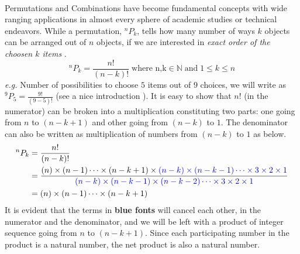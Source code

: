 \documentclass[10pt, twoside]{article}
\newcommand*{\Permutation}[2]{{}^{#1}P_{#2}}%
\begin{document}
	\paragraph{}Permutations and Combinations have become fundamental concepts with wide ranging applications in almost every sphere of academic studies or technical endeavors. While a permutation, $\Permutation{n}{k}$, tells how many number of ways $k$ objects can be arranged out of $n$ objects, if we are interested in \textit{exact order of the choosen $k$ items} \cite{PrincTechCombinatorics}.
		\begin{equation}
			\Permutation{n}{k} = \frac{n!}{(n-k)!}  \; \text{where n,k} \in \mathbb{N}  \; \text{and} \; 1 \leq k \leq n
		\end{equation}
		 \textit{e.g.} Number of possibilities to choose $5$ items out of $9$ choices, we will write as $\Permutation{9}{5} =\frac{9!}{(9-5)!}$ (see a nice introduction \cite{ProbabilityKIndle}).
		 It is easy to show that $n!$ (in the numerator) can be broken into a multiplication constituting two parts: one going from $n$ to $(n-k+1)$ and other going from $(n-k)$ to $1$. The denominator can also be written as multiplication of numbers from {\color{blue}$(n-k)$} to {\color{blue}$1$} as below.
		 \begin{align}
		 	\Permutation{n}{k} &= \frac{n!}{(n-k)!} \nonumber \\
		 	&= \frac{(n)\times(n-1)\cdots\times(n-k+1)\times\color{blue}(n-k)\times(n-k-1)\cdots\times3\times2\times1}{\color{blue}(n-k)\times(n-k-1)\times(n-k-2)\cdots\times3\times2\times1} \nonumber \\
		 	&= (n)\times(n-1)\cdots\times(n-k+1) \label{CondensedEquationPermutation}
		 \end{align}
	 	It is evident that the terms in \textbf{\color{blue}blue fonts} will cancel each other, in the numerator and the denominator, and we will be left with a product of integer sequence going from $n$ to $(n-k+1)$. Since each participating number in the product is a natural number, the net product is also a natural number.
	 	
\end{document}
